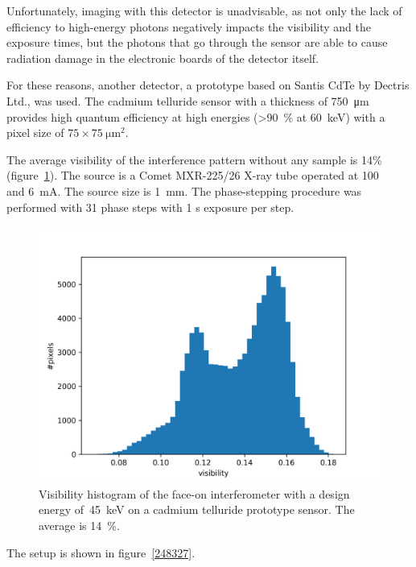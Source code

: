 Unfortunately, imaging with this detector is unadvisable, as not only the lack of efficiency to
high-energy photons negatively impacts the visibility and the exposure
times, but the photons that go through the sensor are able to cause
radiation damage in the electronic boards of the detector itself.

For these reasons, another detector, a prototype based on Santis CdTe by
Dectris Ltd., was used. The cadmium
telluride sensor with a thickness of \SI{750}{\micro\meter} provides high
quantum efficiency at high energies (>\SI{90}{\percent} at
\SI{60}{\kilo\eV}) with a pixel size of
$75\times\SI{75}{\micro\meter\squared}$. 

The average visibility of the interference pattern without any
sample is 14\% (figure~\ref{fig:visibility-titlis}). The source is a Comet
MXR-225/26 X-ray tube operated at \SI{100}{\kilo\voltpeak} and
\SI{6}{\milli\ampere}. The source size is \SI{1}{\milli\meter}.
The phase-stepping procedure was performed with 31 phase steps with 1 s
exposure per step.

\begin{figure}[htb]
    \centering
    \includegraphics[width=.8\textwidth]{gfx/visibility_titlis.png}
    \caption[Visibility of the face-on interferometer]{Visibility histogram of the face-on interferometer with a
        design energy of~\SI{45}{\kilo\eV} on a cadmium telluride prototype
        sensor. The average is
        \SI{14}{\percent}.}
    \label{fig:visibility-titlis}
\end{figure}

The setup is shown in figure~\ref{248327}.

